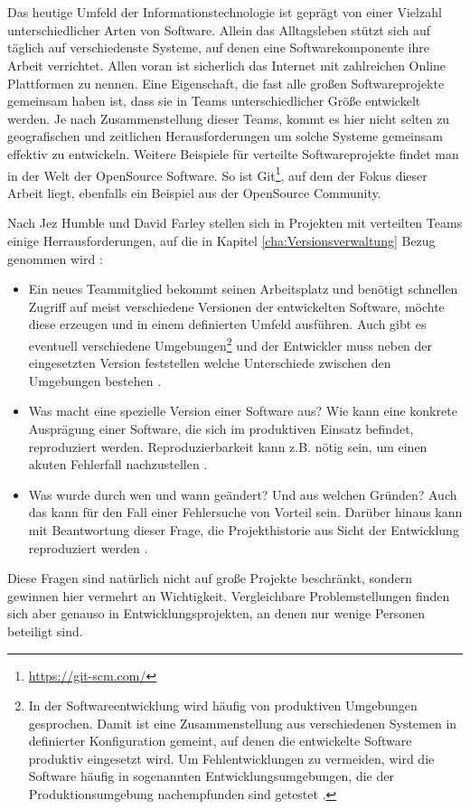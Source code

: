 \chapter{\preamble}
\label{cha:preamble}
Das heutige Umfeld der Informationstechnologie ist gepr\"agt von einer Vielzahl
unterschiedlicher Arten von Software. Allein das Alltagsleben stützt sich auf
täglich auf verschiedenste Systeme, auf denen eine Softwarekomponente ihre
Arbeit verrichtet.  Allen voran ist sicherlich das Internet mit zahlreichen
Online Plattformen zu nennen.  Eine Eigenschaft, die fast alle gro\ss{}en
Softwareprojekte gemeinsam haben ist, dass sie in Teams unterschiedlicher
Gr\"o\ss{}e entwickelt werden. Je nach Zusammenstellung dieser Teams, kommt es
hier nicht selten zu geografischen und zeitlichen Herausforderungen um solche
Systeme gemeinsam effektiv zu entwickeln.  Weitere Beispiele f\"ur verteilte
Softwareprojekte findet man in der Welt der \gls{OpenSource} Software.  So ist
Git\footnote{\label{git:1}\url{https://git-scm.com/}}, auf dem der Fokus dieser
Arbeit liegt, ebenfalls ein Beispiel aus der \gls{OpenSource} Community. 

Nach Jez Humble und David Farley stellen sich in Projekten mit verteilten
Teams einige Herrausforderungen, auf die in Kapitel
\ref{cha:Versionsverwaltung} Bezug genommen wird \cite[S.~26, 33]{cd}:
\begin{itemize}
	\item Ein neues Teammitglied bekommt seinen Arbeitsplatz und ben\"otigt
	schnellen Zugriff auf meist verschiedene Versionen der entwickelten Software,
	m\"ochte diese erzeugen und in einem definierten Umfeld ausf\"uhren. Auch gibt
	es eventuell verschiedene Umgebungen\footnote{\label{umgebung:1}In der
	Softwareentwicklung wird häufig von produktiven Umgebungen gesprochen. Damit
	ist eine Zusammenstellung aus verschiedenen Systemen in definierter
	Konfiguration gemeint, auf denen die entwickelte Software produktiv eingesetzt
	wird. Um Fehlentwicklungen zu vermeiden, wird die Software häufig in
	sogenannten Entwicklungsumgebungen, die der Produktionsumgebung nachempfunden
	sind getestet \cite[S.~49, 250]{cd}.} und der Entwickler muss neben der
	eingesetzten Version feststellen welche Unterschiede zwischen den Umgebungen
	bestehen \citep[S.~26]{cd}.
  \item Was macht eine spezielle Version einer Software aus? Wie kann eine
  konkrete Auspr\"agung einer Software, die sich im produktiven Einsatz
  befindet, reproduziert werden. Reproduzierbarkeit kann z.B. n\"otig sein, um
  einen akuten Fehlerfall nachzustellen \cite[s.~33]{cd}.
  \item Was wurde durch wen und wann ge\"andert? Und aus welchen Gr\"unden?
  Auch das kann f\"ur den Fall einer Fehlersuche von Vorteil sein. Darüber
  hinaus kann mit Beantwortung dieser Frage, die Projekthistorie aus Sicht der
  Entwicklung reproduziert werden \cite[S.~33]{cd}.
\end{itemize}
Diese Fragen sind natürlich nicht auf große Projekte beschränkt, sondern
gewinnen hier vermehrt an Wichtigkeit. Vergleichbare Problemstellungen finden
sich aber genauso in Entwicklungsprojekten, an denen nur wenige Personen
beteiligt sind. 

